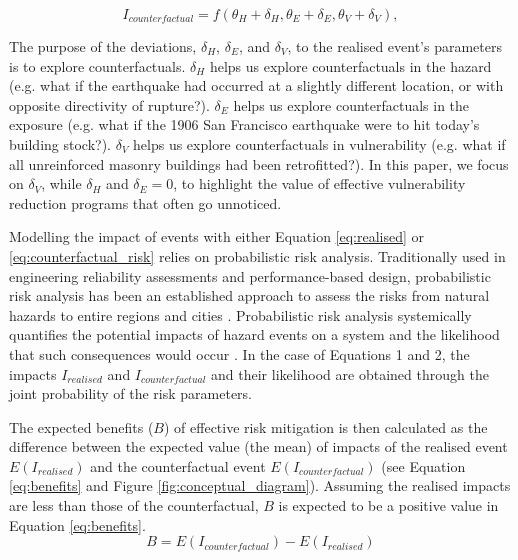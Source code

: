 \begin{equation}\label{eq:counterfactual_risk}
    I_{counterfactual} = f \left( \theta_H + \delta_H,  \theta_E + \delta_E,  \theta_V + \delta_V \right),
    \end{equation}

The purpose of the deviations, $\delta_H$, $\delta_E$, and $\delta_V$, to the realised event’s parameters is to explore counterfactuals. $\delta_H$ helps us explore counterfactuals in the hazard (e.g. what if the earthquake had occurred at a slightly different location, or with opposite directivity of rupture?). $\delta_E$ helps us explore counterfactuals in the exposure (e.g. what if the 1906 San Francisco earthquake were to hit today’s building stock?). $\delta_V$ helps us explore counterfactuals in vulnerability (e.g. what if all unreinforced masonry buildings had been retrofitted?). In this paper, we focus on $\delta_V$, while $\delta_H$ and $\delta_E=0$, to highlight the value of effective vulnerability reduction programs that often go unnoticed.

Modelling the impact of events with either Equation \ref{eq:realised} or \ref{eq:counterfactual_risk} relies on probabilistic risk analysis. Traditionally used in engineering reliability assessments and performance-based design, probabilistic risk analysis has been an established approach to assess the risks from natural hazards to entire regions and cities \citep{pate2002risk, stergiou2010risk}. Probabilistic risk analysis systemically quantifies the potential impacts of hazard events on a system and the likelihood that such consequences would occur \citep{bedford2001probabilistic}. In the case of Equations 1 and 2, the impacts $I_{realised}$ and $I_{counterfactual}$ and their likelihood are obtained through the joint probability of the risk parameters.

The expected benefits ($B$) of effective risk mitigation is then calculated as the difference between the expected value (the mean) of impacts of the realised event $E(I_{realised})$ and the counterfactual event $E(I_{counterfactual})$ (see Equation \ref{eq:benefits} and Figure \ref{fig:conceptual_diagram}). Assuming the realised impacts are less than those of the counterfactual, $B$ is expected to be a positive value in Equation \ref{eq:benefits}.
    \begin{equation} \label{eq:benefits}
        B = E(I_{counterfactual}) - E(I_{realised})
    \end{equation}


